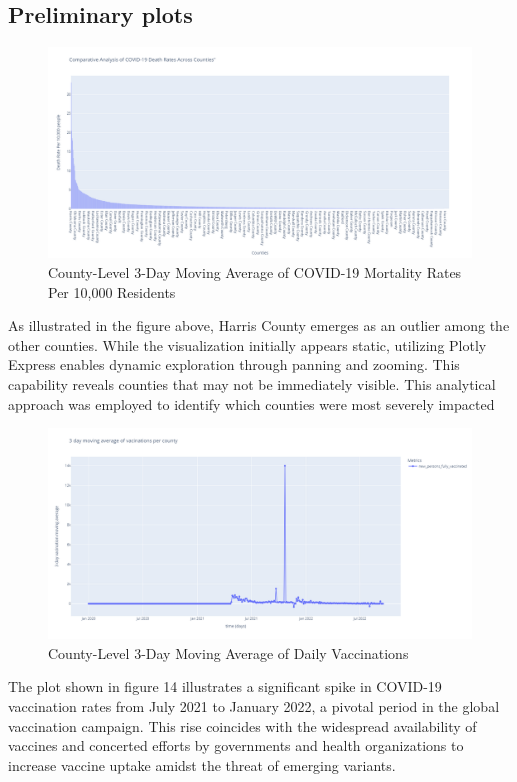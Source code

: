 \documentclass[sigconf,screen,nonacm]{acmart}
\begin{document}
\subsection{Preliminary plots}
\begin{figure}[H]
  \centering
  \includegraphics[width=\linewidth]{Figures/3daymovingaverage.png}
  \caption{County-Level 3-Day Moving Average of COVID-19 Mortality Rates Per 10,000 Residents}
  \label{fig:3day_moving_average_mortality}
\end{figure}

As illustrated in the figure above, Harris County emerges as an outlier among the other counties. While the visualization initially appears static, utilizing Plotly Express enables dynamic exploration through panning and zooming. This capability reveals counties that may not be immediately visible. This analytical approach was employed to identify which counties were most severely impacted
\begin{figure}[H]
  \centering
  \includegraphics[width=\linewidth]{Figures/3daymovingaveragevacines.png}
  \caption{County-Level 3-Day Moving Average of Daily Vaccinations}
  \label{fig:3day_moving_average_vaccines}
\end{figure}
\noindent
The plot shown in figure 14 illustrates a significant spike in COVID-19 vaccination rates from July 2021 to January 2022, a pivotal period in the global vaccination campaign. This rise coincides with the widespread availability of vaccines and concerted efforts by governments and health organizations to increase vaccine uptake amidst the threat of emerging variants.
\end{document}
